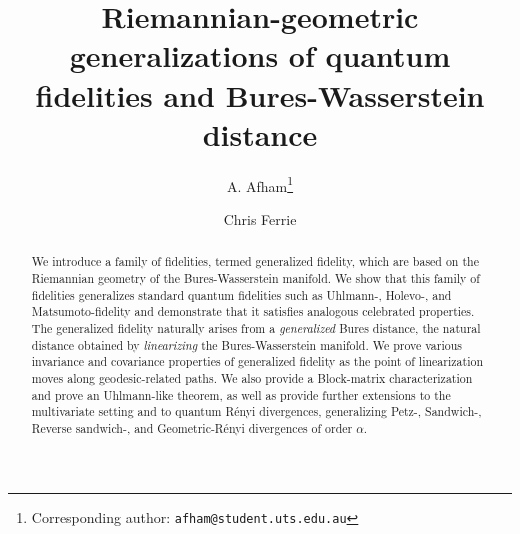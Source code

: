 \documentclass[12pt]{article}
\date{}
\theoremstyle{definition}
\begin{document}
\title{\vspace*{-2cm}Riemannian-geometric generalizations of quantum fidelities and Bures-Wasserstein distance}

\author[1,2]{A. Afham\thanks{Corresponding author: \texttt{afham@student.uts.edu.au}}}
\author[1]{Chris Ferrie}



\maketitle
\vspace*{-1cm}
\begin{abstract}
    We introduce a family of fidelities, termed generalized fidelity, which are based on the Riemannian geometry of the Bures-Wasserstein manifold. We show that this family of fidelities generalizes standard quantum fidelities such as Uhlmann-, Holevo-, and Matsumoto-fidelity and demonstrate that it satisfies analogous celebrated properties. The generalized fidelity naturally arises from a \textit{generalized} Bures distance, the natural distance obtained by \textit{linearizing} the Bures-Wasserstein manifold. We prove various invariance and covariance properties of generalized fidelity as the point of linearization moves along geodesic-related paths. We also provide a Block-matrix characterization and prove an Uhlmann-like theorem, as well as provide further extensions to the multivariate setting and to quantum R\'enyi divergences, generalizing Petz-, Sandwich-, Reverse sandwich-, and Geometric-R\'enyi divergences of order $\alpha$.

    

\end{abstract}

\vspace{1cm}

\renewcommand{\baselinestretch}{.4}\normalsize
\tableofcontents
\renewcommand{\baselinestretch}{1.0}\normalsize


\pagebreak


\end{document}
